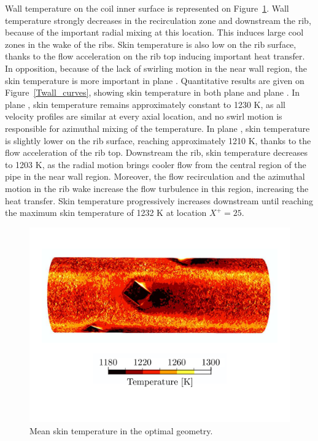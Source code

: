 Wall temperature on the coil inner surface is represented on Figure~\ref{Twall}. Wall temperature strongly decreases in the recirculation zone and downstream the rib, because of the important radial mixing at this location. This induces large cool zones in the wake of the ribs. Skin temperature is also low on the rib surface, thanks to the flow acceleration on the rib top inducing important heat transfer. In opposition, because of the lack of swirling motion in the near wall region, the skin temperature is more important in plane . Quantitative results are given on Figure~\ref{Twall_curves}, showing skin temperature in both plane  and plane . In plane , skin temperature remains approximately constant to 1230 K, as all velocity profiles are similar at every axial location, and no swirl motion is responsible for azimuthal mixing of the temperature. In plane , skin temperature is slightly lower on the rib surface, reaching approximately 1210 K, thanks to the flow acceleration of the rib top. Downstream the rib, skin temperature decreases to 1203 K, as the radial motion brings cooler flow from the central region of the pipe in the near wall region. Moreover, the flow recirculation and the azimuthal motion in the rib wake increase the flow turbulence in this region, increasing the heat transfer. Skin temperature progressively increases downstream until reaching the maximum skin temperature of 1232 K at location $X^+=25$.

\begin{figure}[!h]
\centering
\includegraphics[width=\linewidth]{fig/applications/optim/Twall.pdf}
\caption{Mean skin temperature in the optimal geometry.}
\label{Twall}
\end{figure}

